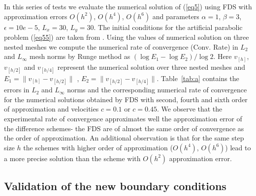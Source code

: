 \documentclass[preprint]{elsarticle}
\newcommand{\rf}[1]{(\ref{#1})}
\begin{document}
 In this series of tests we evaluate the numerical solution of \rf{eq5} using FDS with approximation errors $O(h^2)$, $O(h^4)$, $O(h^6)$ and parameters  
 $\alpha = 1$,   $\beta=3$,  $\epsilon = 10e-5$, 
$L_{x }= 30$, $L_{y} = 30$.
The initial conditions for the artificial parabolic problem \rf{eq55} are taken from  \cite{Ch2011}. 
Using the values of numerical solution on three nested meshes we compute the numerical rate of convergence (Conv. Rate) in $L_2$ and $L_{\infty}$ mesh norms
by Runge method as $(\log E_1 -\log E_2)/\log 2$.  Here  $v_{[h]}$, $v_{ {[h/2]}  }$ and  $v_{ {[h/4]}  }$ represent the numerical solution over three nested meshes and $E_1=\|v_{[h]}-v_{[h/2]}\|$ , $E_2=\|v_{[h/2]}-v_{[h/4]}\|$.  
Table~\ref{tab:a} contains the errors in $L_2$ and $L_{\infty}$ norms and the corresponding numerical rate of convergence for the numerical solutions obtained by FDS with second, fourth and sixth order of approximation and   velocities  $c=0.1$  or $c=0.45$.
We observe that the experimental rate of convergence approximates well the approximation error of the difference schemes- the FDS are of  almost the same order of convergence as the order of approximation. An additional observation  is that  for  the same step size $h$ the schemes with higher order of approximation ($O(h^4)$, $O(h^6)$) lead to a more precise solution than the scheme with $O(h^2)$ approximation error. 


\subsection{Validation of the new boundary conditions}
\end{document}
